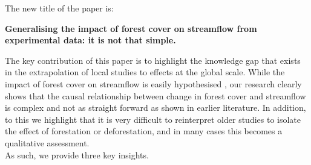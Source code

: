 \documentclass[]{elsarticle} %
\begin{document}
The new title of the paper is:

\textbf{Generalising the impact of forest cover on streamflow from experimental data: it is not that simple.}

The key contribution of this paper is to highlight the knowledge gap that exists in the extrapolation of local studies to effects at the global scale. While the impact of forest cover on streamflow is easily hypothesised \citep[e.g.][]{zhou2015, hoekvandijke2022}, our research clearly shows that the causal relationship between change in forest cover and streamflow is complex and not as straight forward as shown in earlier literature. In addition, to this we highlight that it is very difficult to reinterpret older studies to isolate the effect of forestation or deforestation, and in many cases this becomes a qualitative assessment.\\
As such, we provide three key insights.
\end{document}
